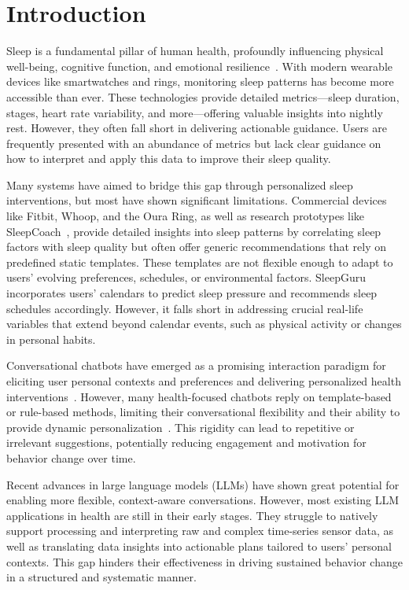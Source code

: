 \section{Introduction}\label{sec.intro}

Sleep is a fundamental pillar of human health, profoundly influencing physical well-being, cognitive function, and emotional resilience~\cite{medic2017short}. 
With modern wearable devices like smartwatches and rings, monitoring sleep patterns has become more accessible than ever. These technologies provide detailed metrics—sleep duration, stages, heart rate variability, and more—offering valuable insights into nightly rest. However, they often fall short in delivering actionable guidance.
Users are frequently presented with an abundance of metrics but lack clear guidance on how to interpret and apply this data to improve their sleep quality.

Many systems have aimed to bridge this gap through personalized sleep interventions, but most have shown significant limitations. 
Commercial devices like Fitbit, Whoop, and the Oura Ring, as well as research prototypes like SleepCoach~\cite{daskalova2016sleepcoacher}, provide detailed insights into sleep patterns by correlating sleep factors with sleep quality but often offer generic recommendations that rely on predefined static templates. These templates are not flexible enough to adapt to users' evolving preferences, schedules, or environmental factors. 
SleepGuru~\cite{lee2022sleepguru} incorporates users' calendars to predict sleep pressure and recommends sleep schedules accordingly. 
However, it falls short in addressing crucial real-life variables that extend beyond calendar events, such as physical activity or changes in personal habits.

Conversational chatbots have emerged as a promising interaction paradigm for eliciting user personal contexts and preferences and delivering personalized health interventions~\cite{bickmore2005establishing, fitzpatrick2017delivering}.
However, many health-focused chatbots reply on template-based or rule-based methods, limiting their conversational flexibility and their ability to provide dynamic personalization~\cite{laranjo2018conversational}. 
This rigidity can lead to repetitive or irrelevant suggestions, potentially reducing engagement and motivation for behavior change over time.

Recent advances in large language models (LLMs) have shown great potential for enabling more flexible, context-aware conversations.
However, most existing LLM applications in health are still in their early stages. 
They struggle to natively support processing and interpreting raw and complex time-series sensor data, as well as translating data insights into actionable plans tailored to users' personal contexts. This gap hinders their effectiveness in driving sustained behavior change in a structured and systematic manner.

